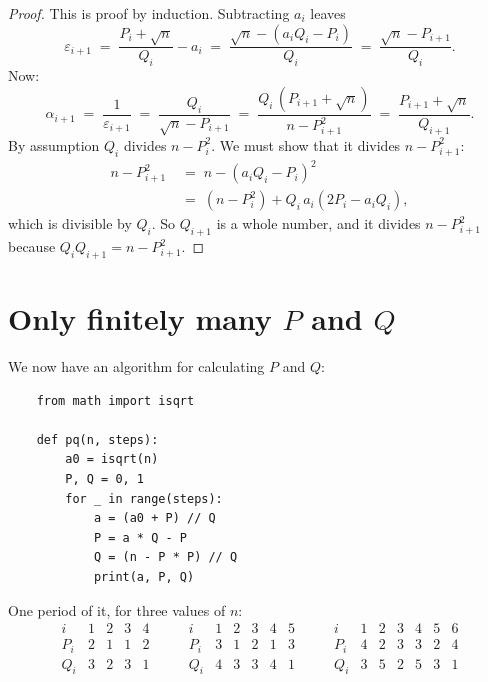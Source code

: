\documentclass[12pt,a4paper]{article}
\theoremstyle{plain}
\theoremstyle{definition}
\begin{document}
\begin{proof}
This is proof by induction. Subtracting $a_i$ leaves
\[
  \varepsilon_{i+1} \;=\; \frac{P_i + \sqrt n}{Q_i} - a_i
    \;=\; \frac{\sqrt n - (a_iQ_i - P_i)}{Q_i}
    \;=\; \frac{\sqrt n - P_{i+1}}{Q_i} .
\]
Now:
\[
  \alpha_{i+1} \;=\; \frac{1}{\varepsilon_{i+1}}
    \;=\; \frac{Q_i}{\sqrt n - P_{i+1}}
    \;=\; \frac{Q_i\,(P_{i+1} + \sqrt n)}{n - P_{i+1}^2}
    \;=\; \frac{P_{i+1} + \sqrt n}{Q_{i+1}} .
\]
By assumption $Q_i$ divides $n - P_i^2$. We must show that it divides
$n - P_{i+1}^2$:
\begin{align*}
  n - P_{i+1}^2 \;&=\; n - (a_iQ_i - P_i)^2 \\
    \;&=\; (n - P_i^2) + Q_i\,a_i(2P_i - a_iQ_i) ,
\end{align*}
which is divisible by $Q_i$. So $Q_{i+1}$ is a whole number, and it divides
$n - P_{i+1}^2$ because $Q_iQ_{i+1} = n - P_{i+1}^2$.
\end{proof}

\clearpage
\section{Only finitely many $P$ and $Q$}

We now have an algorithm for calculating $P$ and $Q$:

\begin{verbatim}
    from math import isqrt

    def pq(n, steps):
        a0 = isqrt(n)
        P, Q = 0, 1
        for _ in range(steps):
            a = (a0 + P) // Q
            P = a * Q - P
            Q = (n - P * P) // Q
            print(a, P, Q)
\end{verbatim}

One period of it, for three values of $n$:
\[
  \begin{array}{c|cccc}
    i   & 1 & 2 & 3 & 4 \\ \hline
    P_i & 2 & 1 & 1 & 2 \\
    Q_i & 3 & 2 & 3 & 1
  \end{array}
  \qquad
  \begin{array}{c|ccccc}
    i   & 1 & 2 & 3 & 4 & 5 \\ \hline
    P_i & 3 & 1 & 2 & 1 & 3 \\
    Q_i & 4 & 3 & 3 & 4 & 1
  \end{array}
  \qquad
  \begin{array}{c|cccccc}
    i   & 1 & 2 & 3 & 4 & 5 & 6 \\ \hline
    P_i & 4 & 2 & 3 & 3 & 2 & 4 \\
    Q_i & 3 & 5 & 2 & 5 & 3 & 1
  \end{array}
\]
\end{document}
